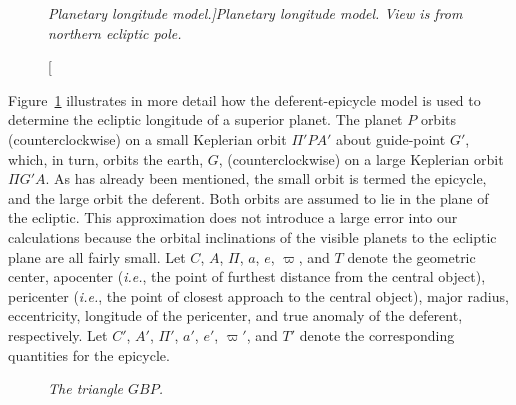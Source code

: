\begin{figure}
\epsfysize=3in
\centerline{}
\caption[\em Planetary longitude model.]{\em Planetary longitude model. View is from northern ecliptic pole. }\label{vf4}
\end{figure}

Figure~\ref{vf4} illustrates in more detail how the deferent-epicycle model
is used to determine the ecliptic longitude of a superior planet.
The planet $P$  orbits (counterclockwise) on a small Keplerian orbit $\Pi'PA'$
about  guide-point $G'$, which, in turn, orbits the earth, $G$, (counterclockwise) on a large
Keplerian orbit $\Pi G'A$. As has already been mentioned, the small orbit is termed the epicycle, and the large orbit  the deferent. Both orbits are assumed to lie in the plane of the ecliptic. This approximation does not
introduce a large error into our calculations because the orbital inclinations  of the visible planets to
the ecliptic plane are all fairly small.
 Let $C$, $A$, $\Pi$, $a$, $e$, $\varpi$,
and $T$ denote the geometric center, apocenter ({\em i.e.}, the point of
furthest distance from the central object), pericenter ({\em i.e.}, the
point of closest approach to the central object), major radius, eccentricity, longitude
of the pericenter, and true anomaly of the deferent, respectively. Let $C'$, $A'$, $\Pi'$, $a'$, $e'$, $\varpi'$, and $T'$ denote the corresponding
quantities for the epicycle.

\begin{figure}[h]
\epsfysize=2.5in
\centerline{}
\caption{\em The triangle $GBP$.}\label{vf5xx}
\end{figure}

